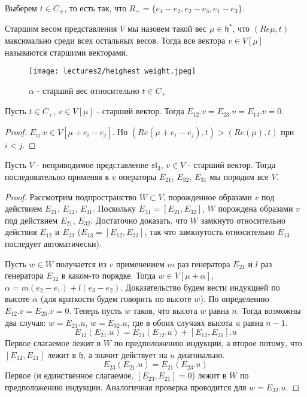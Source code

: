\documentclass[a4article]{article}
\begin{document}
Выберем $t \in C_+$, то есть так, что $R_+ = \{e_1-e_2, e_2-e_3, e_1 - e_3\}$. 
\begin{definition}
    Старшим весом представления $V$ мы назовем такой вес $\mu \in \mathfrak{h}^*$, что $(Re\mu, t)$ максимально среди всех остальных весов. Тогда все вектора $v \in V[\mu]$ называются старшими векторами.
\end{definition}
\begin{example}
    \begin{figure}[h!]
    \centering
    \texttt{[image: lectures2/heighest weight.jpeg]}
    \caption{$\alpha$ - старший вес относительно $t \in C_+$}
    \label{fig:enter-label}
\end{figure}
\end{example}
\newpage
\begin{lemma}
    Пусть $t \in C_+$, $v \in V[\mu]$ - старший вектор. Тогда $E_{12}.v = E_{23}.v = E_{13}.v = 0$.
\end{lemma}
\begin{proof}
    $E_{ij}.v \in V[\mu + e_i-e_j]$. Но $(Re(\mu + e_i-e_j),t) > (Re(\mu), t)$ при $i < j$.
\end{proof}
\begin{theorem}
\label{verma}
    Пусть $V$ - неприводимое представление $\mathfrak{sl}_3$, $v \in V$ - старший вектор. Тогда последовательно применяя к $v$ операторы $E_{21}$, $E_{32}$, $E_{31}$ мы породим все $V$.
\end{theorem}
\begin{proof}
    Рассмотрим подпространство $W \subset V$, порожденное образами $v$ под действием 
    $E_{21}$, $E_{32}$, $E_{31}$. Поскольку $E_{31}=[E_{21}, E_{32}]$, $W$ порождена образами $v$ под действием $E_{21}$, $E_{32}$. Достаточно доказать, что $W$ замкнуто относительно действия $E_{12}$ и $E_{23}$ ($E_{13} = [E_{12}, E_{23}]$, так что замкнутость относительно $E_{13}$ последует автоматически).
    
    Пусть $w \in W$ получается из $v$ применением $m$ раз генератора $E_{21}$ и $l$ раз генератора $E_{32}$ в каком-то порядке. Тогда $w \in V[\mu + \alpha]$, $\alpha = m(e_2-e_1)+l(e_3-e_2)$. Доказательство будем вести индукцией по высоте $\alpha$ (для краткости будем говорить по высоте $w$). По определению $E_{12}.v = E_{23}.v = 0$. Теперь пусть $w$ таков, что высота $w$ равна $n$. Тогда возможны два случая: $w = E_{21}.u$, $w = E_{32}.u$, где в обоих случаях высота $u$ равна $n-1$.
    $$E_{12}(E_{21}.u) = E_{21}(E_{12}.u)+[E_{12}, E_{21}].u$$
    Первое слагаемое лежит в $W$ по предположению индукции, а второе потому, что $[E_{12}, E_{21}]$ лежит в $\mathfrak{h}$, а значит действует на $u$ диагонально.
    $$E_{23}(E_{21}.u) = E_{21}(E_{23}.u)$$
    Первое (и единственное слагаемое, $[E_{23}, E_{21}]=0$) лежит в $W$ по предположению индукции.
    Аналогичная проверка проводится для $w=E_{32}.u$.
\end{proof}
\end{document}
